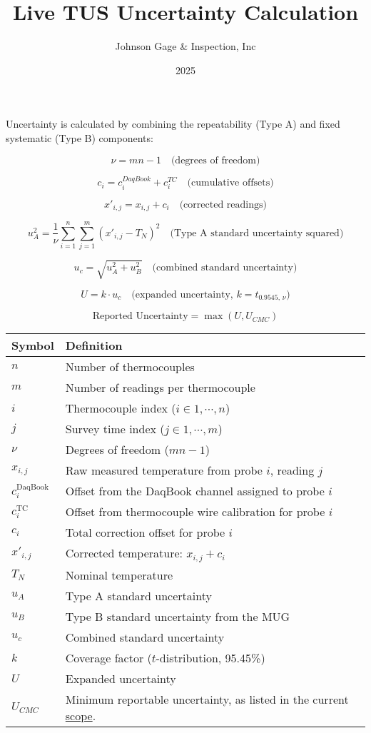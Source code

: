 \documentclass{article}
\title{Live TUS Uncertainty Calculation}
\author{Johnson Gage \& Inspection, Inc}
\date{2025}
\begin{document}
\maketitle

Uncertainty is calculated by combining the repeatability (Type A) and fixed systematic (Type B) components:

\[
\nu = m n - 1
\quad \text{(degrees of freedom)}
\]

\[
c_i = c^{DaqBook}_i + c^{TC}_i
\quad\text{(cumulative offsets)}
\]

\[
x'_{i,j} = x_{i,j} + c_i
\quad\text{(corrected readings)}
\]

\[
u_A^2 = \frac{1}{\nu} \sum_{i=1}^{n} \sum_{j=1}^{m} (x'_{i,j} - T_N)^2
\quad \text{(Type A standard uncertainty squared)}
\]

\[
u_c = \sqrt{u_A^2 + u_B^2}
\quad \text{(combined standard uncertainty)}
\]

\[
U = k \cdot u_c
\quad \text{(expanded uncertainty, } k = t_{0.9545,\, \nu} \text{)}
\]

\[
\text{Reported Uncertainty} = \max(U, U_{CMC})
\]

\vspace{1em}
\begin{tabular}{@{}ll@{}}
\toprule
Symbol & Definition \\
\midrule
\( n \)     & Number of thermocouples \\
\( m \)     & Number of readings per thermocouple \\
\( i \)     & Thermocouple index ($i \in 1,\cdots,n$) \\
\( j \)     & Survey time index ($j \in 1,\cdots,m$) \\
\( \nu \)   & Degrees of freedom ($mn - 1$) \\
\( x_{i,j} \) & Raw measured temperature from probe \( i \), reading \( j \) \\
\( c^{\mathrm{DaqBook}}_i \) & Offset from the DaqBook channel assigned to probe \( i \) \\
\( c^{\mathrm{TC}}_i \) & Offset from thermocouple wire calibration for probe \( i \) \\
\( c_i \)   & Total correction offset for probe \( i \) \\
\( x'_{i,j} \) & Corrected temperature: \( x_{i,j} + c_i \) \\
\( T_N \)     & Nominal temperature \\
\( u_A \)   & Type A standard uncertainty \\
\( u_B \)   & Type B standard uncertainty from the MUG \\
\( u_c \)   & Combined standard uncertainty \\
\( k \)     & Coverage factor (\( t \)-distribution, 95.45\%) \\
\( U \)     & Expanded uncertainty \\
\textit{$U_{CMC}$} & Minimum reportable uncertainty, as listed in the current \href{https://customer.a2la.org/index.cfm?event=directory.detail&labPID=46ECE43E-423E-465E-8FBB-36DC011ED988}{scope}.\\
\bottomrule
\end{tabular}
\end{document}
